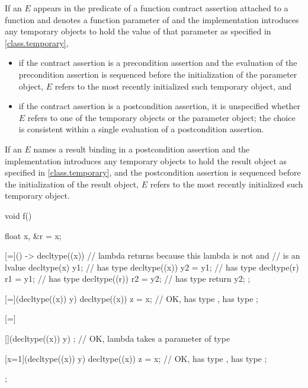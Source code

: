 \pnum
If an  $E$
appears in the predicate of
a function contract assertion attached to a function 
and denotes
a function parameter of 
and the implementation introduces any temporary objects
to hold the value of that parameter as specified in \ref{class.temporary},
\begin{itemize}
\item
if the contract assertion
is a precondition assertion
and the evaluation of the precondition assertion
is sequenced before the initialization of the parameter object,
$E$ refers to the most recently initialized such temporary object, and
\item
if the contract assertion
is a postcondition assertion,
it is unspecified whether $E$ refers to
one of the temporary objects or the parameter object;
the choice is consistent within a single evaluation of a postcondition assertion.
\end{itemize}

\pnum
If an  $E$
names a result binding
in a postcondition assertion
and the implementation introduces any temporary objects
to hold the result object as specified in \ref{class.temporary},
and the postcondition assertion
is sequenced before the initialization of the result object,
$E$ refers to the most recently initialized such temporary object.


\begin{example}
\begin{codeblock}
void f() {
  float x, &r = x;

  [=]() -> decltype((x)) {      // lambda returns  because this lambda is not  and
                                //  is an lvalue
    decltype(x) y1;             //  has type 
    decltype((x)) y2 = y1;      //  has type 
    decltype(r) r1 = y1;        //  has type 
    decltype((r)) r2 = y2;      //  has type 
    return y2;
  };

  [=](decltype((x)) y) {
    decltype((x)) z = x;        // OK,  has type ,  has type 
  };

  [=] {
    [](decltype((x)) y) {};     // OK, lambda takes a parameter of type 

    [x=1](decltype((x)) y) {
      decltype((x)) z = x;      // OK,  has type ,  has type 
    };
  };
}
\end{codeblock}
\end{example}

